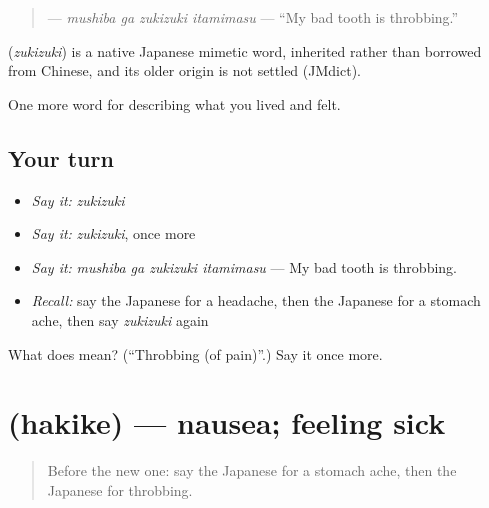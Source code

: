 \begin{quote}
\textbf{  } — \emph{mushiba ga zukizuki itamimasu} — \textquotedblleft{}My bad tooth is throbbing.\textquotedblright{}
\end{quote}

\begin{cousinweb}
\textbf{} (\emph{zukizuki}) is a native Japanese mimetic word, inherited rather than borrowed from Chinese, and its older origin is not settled (JMdict).
\end{cousinweb}

\begin{grammarlens}[title={What you've built}]
One more word for describing what you lived and felt.
\end{grammarlens}

\subsection*{Your turn}
\begin{itemize}
\raggedright
  \item \emph{Say it:} \emph{zukizuki}
  \item \emph{Say it:} \emph{zukizuki}, once more
  \item \emph{Say it:} \emph{mushiba ga zukizuki itamimasu} — My bad tooth is throbbing.
  \item \emph{Recall:} say the Japanese for a headache, then the Japanese for a stomach ache, then say \emph{zukizuki} again
\end{itemize}

\begin{tcolorbox}[breakable,colback=teal!4,colframe=teal!35!black,title={Before you move on}]
What does  mean? (\textquotedblleft{}Throbbing (of pain)\textquotedblright{}.) Say it once more.
\end{tcolorbox}
\section[\texorpdfstring{\ja{はきけ} (hakike)}{はきけ (hakike)}]{ (hakike) — nausea; feeling sick}

\label{lesson:JA-C445-hakike}



\begin{quote}
Before the new one: say the Japanese for a stomach ache, then the Japanese for throbbing.
\end{quote}

